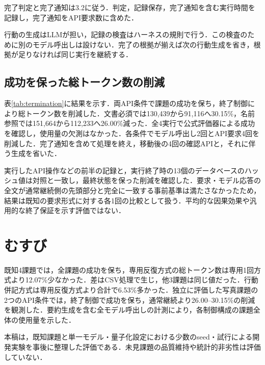 \documentclass[letter]{ieicej}
\begin{document}
完了判定と完了通知は3.2に従う．判定，記録保存，完了通知を含む実行時間を記録し，完了通知をAPI要求数に含めた．

行動の生成はLLMが担い，記録の検査はハーネスの規則で行う．この検査のために別のモデル呼出しは設けない．完了の根拠が揃えば次の行動生成を省き，根拠が足りなければ同じ実行を継続する．

\subsection{成功を保った総トークン数の削減}

表\ref{tab:termination}に結果を示す．両API条件で課題の成功を保ち，終了制御により総トークン数を削減した．文書必須では130,439から91,116へ30.15\%，名前参照では151,664から112,233へ26.00\%減った．全4実行で公式評価器による成功を確認し，使用量の欠測はなかった．各条件でモデル呼出し2回とAPI要求4回を削減した．完了通知を含めて処理を終え，移動後の4回の確認APIと，それに伴う生成を省いた．

\TerminationResultsTable

実行したAPI操作などの前半の記録と，実行終了時の13個のデータベースのハッシュ値は対照と一致し，最終状態を保った削減を確認した．要求・モデル応答の全文が通常継続側の先頭部分と完全に一致する事前基準は満たさなかったため，結果は既知の要求形式に対する各1回の比較として扱う．平均的な因果効果や汎用的な終了保証を示す評価ではない．

\section{むすび}

既知4課題では，全課題の成功を保ち，専用反復方式の総トークン数は専用1回方式より12.07\%少なかった．差はCSV処理で生じ，他3課題は同じ値だった．行動併記方式は専用反復方式より合計で6.53\%多かった．独立に評価した写真課題の2つのAPI条件では，終了制御で成功を保ち，通常継続より26.00--30.15\%の削減を観測した．要約生成を含む全モデル呼出しの計測により，各制御構成の課題全体の使用量を示した．

本稿は，既知課題と単一モデル・量子化設定における少数のseed・試行による開発実験を事後に整理した評価である．未見課題の品質維持や統計的非劣性は評価していない．


\end{document}
